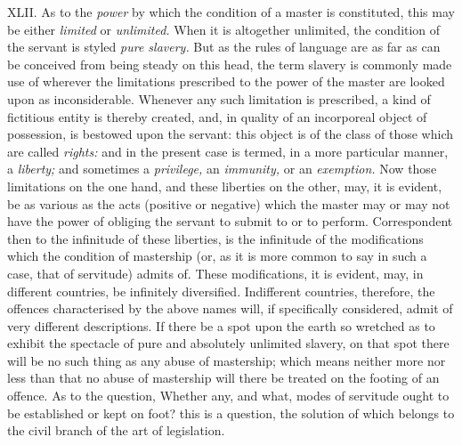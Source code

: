 \documentclass[12pt]{report}
\begin{document}
XLII. As to the \emph{power} by which the condition of a master is
constituted, this may be either \emph{limited} or \emph{unlimited.} When
it is altogether unlimited, the condition of the servant is styled
\emph{pure slavery.} But as the rules of language are as far as can be
conceived from being steady on this head, the term slavery is commonly
made use of wherever the limitations prescribed to the power of the
master are looked upon as inconsiderable. Whenever any such limitation
is prescribed, a kind of fictitious entity is thereby created, and, in
quality of an incorporeal object of possession, is bestowed upon the
servant: this object is of the class of those which are called
\emph{rights:} and in the present case is termed, in a more particular
manner, a \emph{liberty;} and sometimes a \emph{privilege,} an
\emph{immunity,} or an \emph{exemption.} Now those limitations on the
one hand, and these liberties on the other, may, it is evident, be as
various as the acts (positive or negative) which the master may or may
not have the power of obliging the servant to submit to or to perform.
Correspondent then to the infinitude of these liberties, is the
infinitude of the modifications which the condition of mastership (or,
as it is more common to say in such a case, that of servitude) admits
of. These modifications, it is evident, may, in different countries, be
infinitely diversified. Indifferent countries, therefore, the offences
characterised by the above names will, if specifically considered, admit
of very different descriptions. If there be a spot upon the earth so
wretched as to exhibit the spectacle of pure and absolutely unlimited
slavery, on that spot there will be no such thing as any abuse of
mastership; which means neither more nor less than that no abuse of
mastership will there be treated on the footing of an offence. As to the
question, Whether any, and what, modes of servitude ought to\\
be established or kept on foot? this is a question, the solution of
which belongs to the civil branch of the art of legislation.
\end{document}
